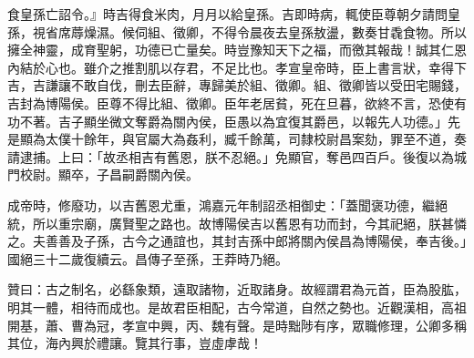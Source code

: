 \begin{pinyinscope}
食皇孫亡詔令。』時吉得食米肉，月月以給皇孫。吉即時病，輒使臣尊朝夕請問皇孫，視省席蓐燥濕。候伺組、徵卿，不得令晨夜去皇孫敖盪，數奏甘毳食物。所以擁全神靈，成育聖躬，功德已亡量矣。時豈豫知天下之福，而徼其報哉！誠其仁恩內結於心也。雖介之推割肌以存君，不足比也。孝宣皇帝時，臣上書言狀，幸得下吉，吉謙讓不敢自伐，刪去臣辭，專歸美於組、徵卿。組、徵卿皆以受田宅賜錢，吉封為博陽侯。臣尊不得比組、徵卿。臣年老居貧，死在旦暮，欲終不言，恐使有功不著。吉子顯坐微文奪爵為關內侯，臣愚以為宜復其爵邑，以報先人功德。」先是顯為太僕十餘年，與官屬大為姦利，臧千餘萬，司隸校尉昌案劾，罪至不道，奏請逮捕。上曰：「故丞相吉有舊恩，朕不忍絕。」免顯官，奪邑四百戶。後復以為城門校尉。顯卒，子昌嗣爵關內侯。

成帝時，修廢功，以吉舊恩尤重，鴻嘉元年制詔丞相御史：「蓋聞褒功德，繼絕統，所以重宗廟，廣賢聖之路也。故博陽侯吉以舊恩有功而封，今其祀絕，朕甚憐之。夫善善及子孫，古今之通誼也，其封吉孫中郎將關內侯昌為博陽侯，奉吉後。」國絕三十二歲復續云。昌傳子至孫，王莽時乃絕。

贊曰：古之制名，必繇象類，遠取諸物，近取諸身。故經謂君為元首，臣為股肱，明其一體，相待而成也。是故君臣相配，古今常道，自然之勢也。近觀漢相，高祖開基，蕭、曹為冠，孝宣中興，丙、魏有聲。是時黜陟有序，眾職修理，公卿多稱其位，海內興於禮讓。覽其行事，豈虛虖哉！


\end{pinyinscope}